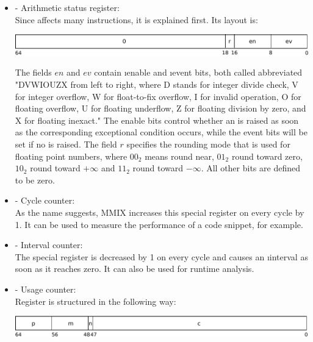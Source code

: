 \begin{itemize}
	\item {} - Arithmetic status register:\\
	Since  affects many instructions, it is explained first. Its layout is:
	
	\includegraphics[width=\linewidth]{img/rA-crop.pdf}
	
	The fields $en$ and $ev$ contain \i{enable} and \i{event} bits, both called abbreviated "DVWIOUZX from left to right, where D stands for integer divide check, V for integer overflow, W for float-to-fix overflow, I for invalid operation, O for floating overflow, U for floating underflow, Z for floating division by zero, and X for floating inexact." \citep[pg. 26]{mmix-doc}
	The enable bits control whether an  is raised as soon as the corresponding exceptional condition occurs, while the event bits will be set if no  is raised.
	The field $r$ specifies the rounding mode that is used for floating point numbers, where $00_2$ means round near, $01_2$ round toward zero, $10_2$ round toward $+\infty$ and $11_2$ round toward $-\infty$. All other bits are defined to be zero. \citep[pg. 15 and 26]{mmix-doc}
	
	\item {} - Cycle counter:\\
	As the name suggests, MMIX increases this special register on every cycle by 1. It can be used to measure the performance of a code snippet, for example. \citep[pg. 32]{mmix-doc}
	\item {} - Interval counter:\\
	The special register  is decreased by 1 on every cycle and causes an \i{interval } as soon as it reaches zero. It can also be used for runtime analysis. \citep[pg. 32]{mmix-doc}
	\item {} - Usage counter:\\
	Register  is structured in the following way:
	
	\includegraphics[width=\linewidth]{img/rU-crop.pdf}
	

\end{itemize}

